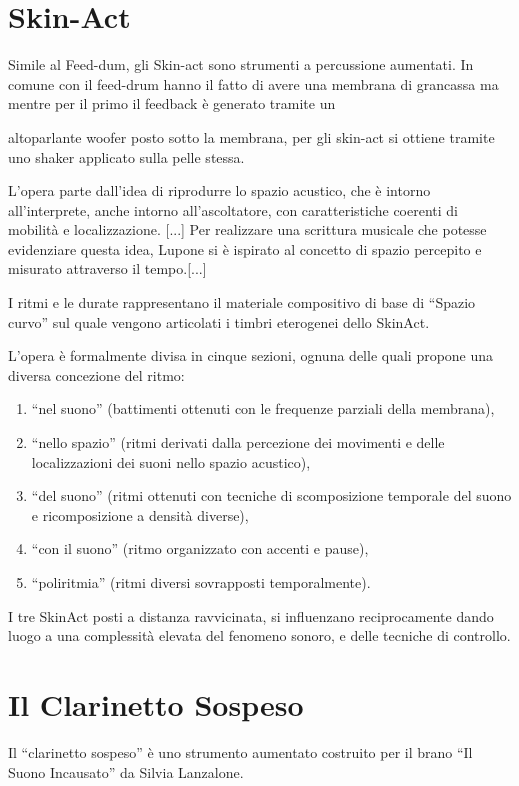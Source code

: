 \section{Skin-Act}

Simile al Feed-dum, gli Skin-act sono strumenti a percussione aumentati.
In comune con il feed-drum hanno il fatto di avere una membrana di grancassa ma
mentre per il primo il feedback è generato tramite un

altoparlante woofer posto sotto la membrana, per gli skin-act si ottiene tramite
uno shaker applicato sulla pelle stessa.

L’opera parte dall’idea di riprodurre lo spazio acustico, che è intorno
all’interprete, anche intorno all’ascoltatore, con caratteristiche coerenti di
mobilità e localizzazione. [...]
Per realizzare una scrittura musicale che potesse evidenziare questa idea,
Lupone si è ispirato al concetto di spazio percepito e misurato attraverso il
tempo.[...]

I ritmi e le durate rappresentano il materiale compositivo di base di
“Spazio curvo” sul quale vengono articolati i timbri eterogenei dello SkinAct.

L’opera è formalmente divisa in cinque sezioni, ognuna delle quali propone una
diversa concezione del ritmo:
\begin{enumerate}
  \item “nel suono” (battimenti ottenuti con le frequenze parziali della membrana),
  \item “nello spazio” (ritmi derivati dalla percezione dei movimenti e delle
localizzazioni dei suoni nello spazio acustico),
  \item“del suono” (ritmi ottenuti con tecniche di scomposizione temporale del
suono e ricomposizione a densità diverse),
  \item“con il suono” (ritmo organizzato con accenti e pause),
  \item“poliritmia” (ritmi diversi sovrapposti temporalmente).
\end{enumerate}

I tre SkinAct posti a distanza ravvicinata, si influenzano reciprocamente dando
luogo a una complessità elevata del fenomeno sonoro, e delle tecniche di controllo.

\section{Il Clarinetto Sospeso}

Il “clarinetto sospeso” è uno strumento aumentato costruito per il brano “Il
Suono Incausato” da Silvia Lanzalone.

